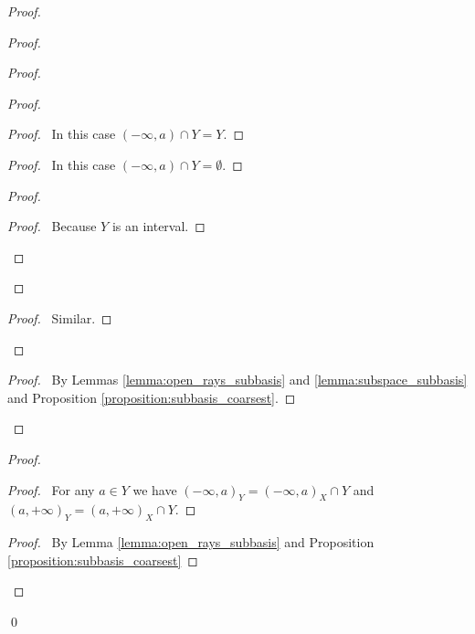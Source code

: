 \begin{proof}
    \pf
    \begin{proof}
        \begin{proof}
            \begin{proof}
                \begin{proof}
                    \pf\ In this case $(-\infty, a) \cap Y = Y$.
                \end{proof}
                \begin{proof}
                    \pf\ In this case $(-\infty, a) \cap Y = \emptyset$.
                \end{proof}
                \begin{proof}
                    \begin{proof}
                        \pf\ Because $Y$ is an interval.
                    \end{proof}
                \end{proof}
            \end{proof}
            \begin{proof}
                \pf\ Similar.
            \end{proof}
        \end{proof}
        \qedstep
        \begin{proof}
            \pf\ By Lemmas \ref{lemma:open_rays_subbasis} and \ref{lemma:subspace_subbasis} and Proposition
            \ref{proposition:subbasis_coarsest}.
        \end{proof}
    \end{proof}
    \begin{proof}
        \begin{proof}
            \pf\ For any $a \in Y$ we have $(-\infty, a)_Y = (-\infty, a)_X \cap Y$
            and $(a, +\infty)_Y = (a,+\infty)_X \cap Y$.
        \end{proof}
        \qedstep
        \begin{proof}
            \pf\ By Lemma \ref{lemma:open_rays_subbasis} and  Proposition
            \ref{proposition:subbasis_coarsest}
        \end{proof}
    \end{proof}
    \qed
\end{proof}

